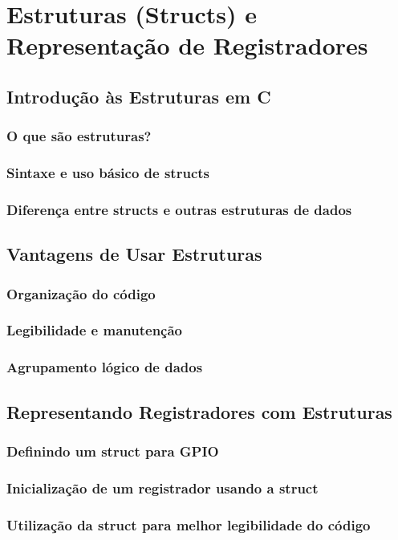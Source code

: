 \section{Estruturas (Structs) e Representação de Registradores}

\subsection{Introdução às Estruturas em C}
\subsubsection{O que são estruturas?}
\subsubsection{Sintaxe e uso básico de structs}
\subsubsection{Diferença entre structs e outras estruturas de dados}

\subsection{Vantagens de Usar Estruturas}
\subsubsection{Organização do código}
\subsubsection{Legibilidade e manutenção}
\subsubsection{Agrupamento lógico de dados}

\subsection{Representando Registradores com Estruturas}
\subsubsection{Definindo um struct para GPIO}
\subsubsection{Inicialização de um registrador usando a struct}
\subsubsection{Utilização da struct para melhor legibilidade do código}